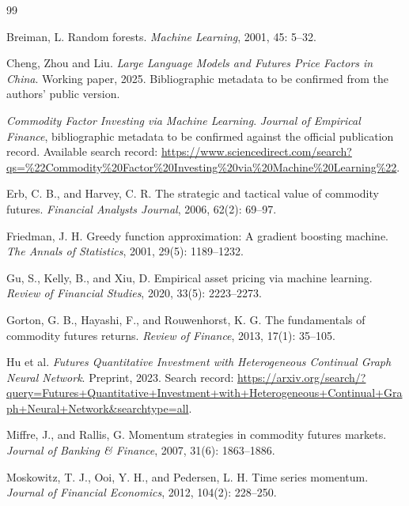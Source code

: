 \documentclass[UTF8,zihao=-4,fontset=ubuntu]{ctexart}
\begin{document}
\clearpage
\begin{thebibliography}{99}

Breiman, L. Random forests. \emph{Machine Learning}, 2001, 45: 5--32.

Cheng, Zhou and Liu. \emph{Large Language Models and Futures Price Factors in China}. Working paper, 2025. Bibliographic metadata to be confirmed from the authors' public version.

\emph{Commodity Factor Investing via Machine Learning}. \emph{Journal of Empirical Finance}, bibliographic metadata to be confirmed against the official publication record. Available search record: \url{https://www.sciencedirect.com/search?qs=%22Commodity%20Factor%20Investing%20via%20Machine%20Learning%22}.

Erb, C. B., and Harvey, C. R. The strategic and tactical value of commodity futures. \emph{Financial Analysts Journal}, 2006, 62(2): 69--97.

Friedman, J. H. Greedy function approximation: A gradient boosting machine. \emph{The Annals of Statistics}, 2001, 29(5): 1189--1232.

Gu, S., Kelly, B., and Xiu, D. Empirical asset pricing via machine learning. \emph{Review of Financial Studies}, 2020, 33(5): 2223--2273.

Gorton, G. B., Hayashi, F., and Rouwenhorst, K. G. The fundamentals of commodity futures returns. \emph{Review of Finance}, 2013, 17(1): 35--105.

Hu et al. \emph{Futures Quantitative Investment with Heterogeneous Continual Graph Neural Network}. Preprint, 2023. Search record: \url{https://arxiv.org/search/?query=Futures+Quantitative+Investment+with+Heterogeneous+Continual+Graph+Neural+Network&searchtype=all}.

Miffre, J., and Rallis, G. Momentum strategies in commodity futures markets. \emph{Journal of Banking \& Finance}, 2007, 31(6): 1863--1886.

Moskowitz, T. J., Ooi, Y. H., and Pedersen, L. H. Time series momentum. \emph{Journal of Financial Economics}, 2012, 104(2): 228--250.

\end{thebibliography}
\end{document}
